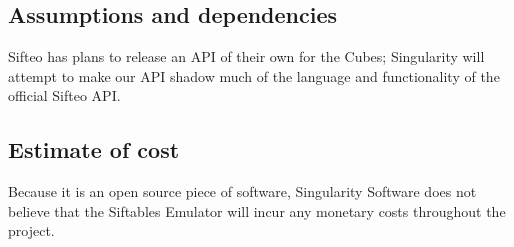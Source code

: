 \documentclass[12pt]{article}
\begin{document}
              \subsection{Assumptions and dependencies}
              Sifteo has plans to release an API of their own for the Cubes; Singularity will attempt to make our API shadow much of the language and functionality of the official Sifteo API. 

              \subsection{Estimate of cost}
			  Because it is an open source piece of software, Singularity Software does not believe that the Siftables Emulator will incur any monetary costs throughout the project.
\clearpage
\end{document}
